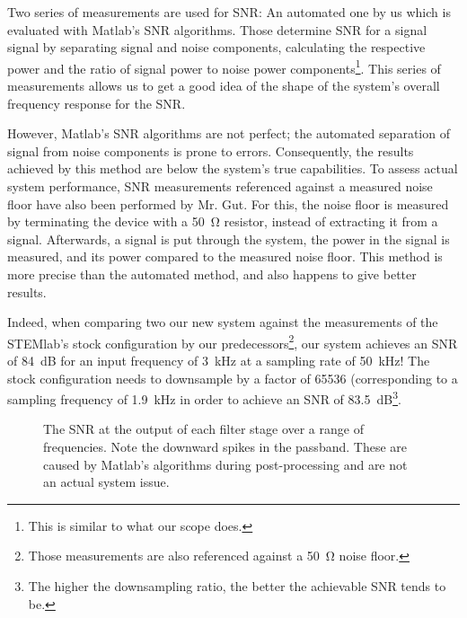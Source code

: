 Two series of measurements  are used for SNR: An automated one  by us which is
evaluated  with Matlab's  SNR  algorithms. Those determine  SNR  for a  signal
signal by separating  signal and noise components,  calculating the respective
power and the ratio of signal power to noise power components\footnote{%
    This is similar to what our scope does.%
}.
This series of measurements  allows us to get a good idea of  the shape of the
system's overall frequency response for the SNR.

However, Matlab's SNR algorithms are  not perfect; the automated separation of
signal from  noise components  is prone  to errors. Consequently,  the results
achieved by  this method are  below the system's true  capabilities. To assess
actual  system performance,  SNR  measurements referenced  against a  measured
noise floor have also been performed  by Mr. Gut. For this, the noise floor is
measured by terminating  the device with a \SI{50}{\ohm}  resistor, instead of
extracting it from  a signal. Afterwards, a signal is put  through the system,
the power in  the signal is measured,  and its power compared  to the measured
noise floor. This method  is more precise than the automated  method, and also
happens to give better results.

Indeed, when comparing two 
our new system against the measurements of the STEMlab's
stock configuration by our predecessors\footnote{%
    Those  measurements  are also  referenced  against  a \SI{50}{\ohm}  noise
    floor.%
}, our system achieves an SNR of \SI{84}{\dB} for an input frequency of \SI{3}{\kHz}
at a sampling rate of \SI{50}{\kHz}! The stock configuration needs to downsample
by a factor of \num{65536} (corresponding to a sampling frequency of \SI{1.9}{\kHz}
in order to achieve an SNR of \SI{83.5}{\dB}\footnote{%
    The higher the downsampling ratio, the  better the achievable SNR tends to
be.%
}.

\begin{figure}
    \centering
    
    \caption[SNR at Filter Outputs]{%
        The  SNR  at  the  output  of  each  filter  stage  over  a  range  of
        frequencies.   Note the  downward  spikes in  the passband. These  are
        caused by  Matlab's algorithms during  post-processing and are  not an
        actual system issue.%
    }
    \label{fig:verification:snrAll}
\end{figure}

